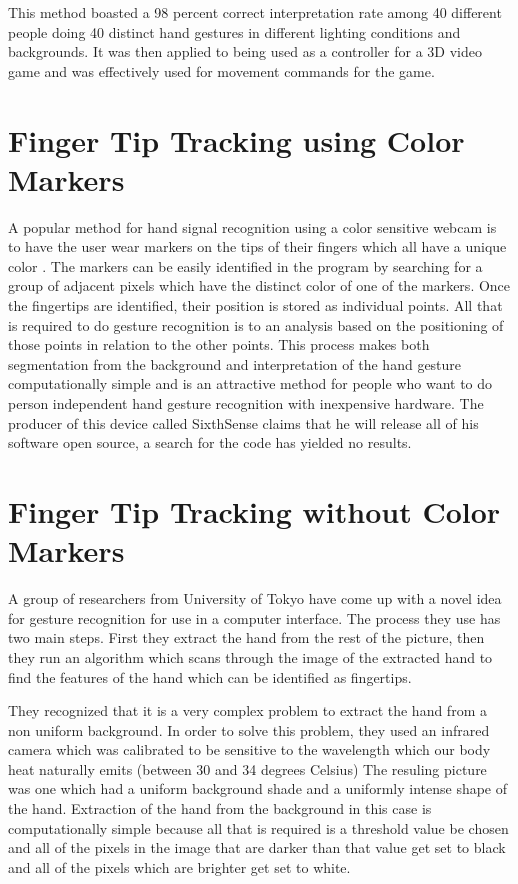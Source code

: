 \documentclass[a4paper,12pt]{report}
\begin{document}
This method boasted a 98 percent correct interpretation rate among 40 different people doing 40 distinct hand gestures in different lighting conditions and backgrounds. It was then applied to being used as a controller for a 3D video game and was effectively used for movement commands for the game.

\section{Finger Tip Tracking using Color Markers}

A popular method for hand signal recognition using a color sensitive webcam is to have the user wear markers on the tips of their fingers which all have a unique color \cite{sixthsense}. The markers can be easily identified in the program by searching for a group of adjacent pixels which have the distinct color of one of the markers. Once the fingertips are identified, their position is stored as individual points. All that is required to do gesture recognition is to an analysis based on the positioning of those points in relation to the other points. This process makes both segmentation from the background and interpretation of the hand gesture computationally simple and is an attractive method for people who want to do person independent hand gesture recognition with inexpensive hardware. The producer of this device called SixthSense claims that he will release all of his software open source, a search for the code has yielded no results.

\section{Finger Tip Tracking without Color Markers}

A group of researchers from University of Tokyo\cite{fingertip} have come up with a novel idea for gesture recognition for use in a computer interface. The process they use has two main steps. First they extract the hand from the rest of the picture, then they run an algorithm which scans through the image of the extracted hand to find the features of the hand which can be identified as fingertips. 

They recognized that it is a very complex problem to extract the hand from a non uniform background. In order to solve this problem, they used an infrared camera which was calibrated to be sensitive to the wavelength which our body heat naturally emits (between 30 and 34 degrees Celsius)  The resuling picture was one which had a uniform background shade and a uniformly intense shape of the hand. Extraction of the hand from the background in this case is computationally simple because all that is required is a threshold value be chosen and all of the pixels in the image that are darker than that value get set to black and all of the pixels which are brighter get set to white.  
\end{document}
